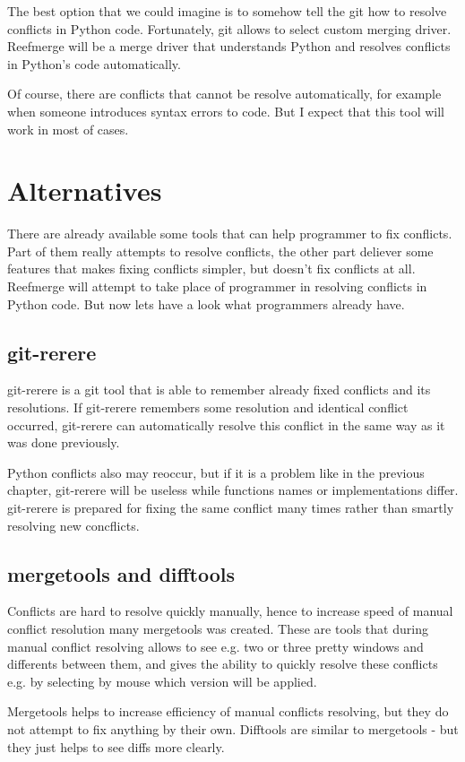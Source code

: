 \documentclass[a4paper,10pt]{article}
\begin{document}
The best option that we could imagine is to somehow tell the git how to resolve conflicts
in Python code. Fortunately, git allows to select custom merging driver.
Reefmerge will be a merge driver that understands Python and resolves conflicts in Python's code automatically.

Of course, there are conflicts that cannot be resolve automatically, for example when someone introduces
syntax errors to code. But I expect that this tool will work in most of cases.

\section*{Alternatives}

There are already available some tools that can help programmer to fix conflicts.
Part of them really attempts to resolve conflicts, the other part deliever some features
that makes fixing conflicts simpler, but doesn't fix conflicts at all.
Reefmerge will attempt to take place of programmer in resolving conflicts in Python code.
But now lets have a look what programmers already have.

\subsection*{git-rerere}
git-rerere is a git tool that is able to remember already fixed conflicts
and its resolutions. If git-rerere remembers some resolution and identical conflict occurred,
git-rerere can automatically resolve this conflict in the same way as it was done previously.

Python conflicts also may reoccur, but if it is a problem like in the previous chapter,
git-rerere will be useless while functions names or implementations differ.
git-rerere is prepared for fixing the same conflict many times rather than smartly resolving new concflicts.

\subsection*{mergetools and difftools}
Conflicts are hard to resolve quickly manually, hence to increase speed of manual conflict resolution
many mergetools was created. These are tools that during manual conflict resolving allows to see e.g. two or three pretty windows
and differents between them, and gives the ability to quickly resolve these conflicts e.g.
by selecting by mouse which version will be applied.

Mergetools helps to increase efficiency of manual conflicts resolving, but they do not attempt
to fix anything by their own. Difftools are similar to mergetools - but they just helps to see
diffs more clearly.
\end{document}
